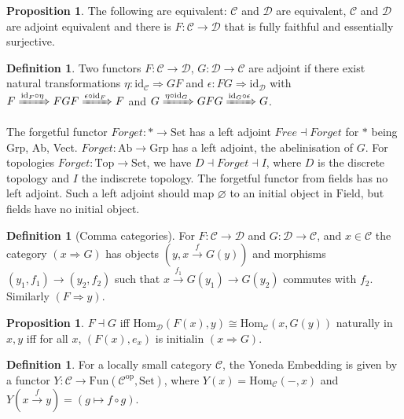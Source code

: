 \documentclass[a4paper,10pt]{article}
\theoremstyle{definition}
\newtheorem{definition}[theorem]{Definition}
\newtheorem{proposition}[theorem]{Proposition}
\newcommand{\Hom}[3][C]{\mathrm{Hom}_\mathcal{#1}(#2, #3)}
\newcommand{\C}{\mathcal{C}}
\newcommand{\D}{\mathcal{D}}
\newcommand{\id}{\mathrm{id}}
\newcommand{\Set}{\mathrm{Set}}
\begin{document}
\begin{proposition}
    The following are equivalent: $\C$ and $\D$ are equivalent, $\C$ and $\D$ are adjoint equivalent and there is $F \colon \C \rightarrow \D$ that is fully faithful and essentially surjective. 
\end{proposition}

\begin{definition}
    Two functors $F \colon \C \rightarrow \D$, $G \colon \D \rightarrow \C$ are adjoint if there exist natural transformations $\eta \colon \id_{\C} \Rightarrow GF$ and $\epsilon \colon FG \Rightarrow \id_{\D}$ with $F \xRightarrow{\id_F \circ \eta} FGF \xRightarrow{\epsilon \circ \id_F} F$ and $G \xRightarrow{\eta \circ \id_G} GFG \xRightarrow{\id_G \circ \epsilon} G$.
\end{definition}

The forgetful functor $\mathit{Forget} \colon * \rightarrow \Set$ has a left adjoint $\mathit{Free} \dashv \mathit{Forget}$ for $*$ being Grp, Ab, Vect. $\mathit{Forget} \colon \mathrm{Ab} \rightarrow \mathrm{Grp}$ has a left adjoint, the abelinisation of $G$. For topologies $\mathit{Forget} \colon \mathrm{Top} \longrightarrow \Set$, we have $D \dashv \mathit{Forget} \dashv I$, where $D$ is the discrete topology and $I$ the indiscrete topology.
The forgetful functor from fields has no left adjoint. Such a left adjoint should map $\varnothing$ to an initial object in $\mathrm{Field}$, but fields have no initial object.

\begin{definition}[Comma categories]
    For $F \colon \C \rightarrow \D$ and $G \colon \D \rightarrow \C$, and $x \in \C$ the category $(x \Rightarrow G)$ has objects $(y, x \xrightarrow{f} G(y))$ and morphisms $(y_1, f_1) \rightarrow (y_2, f_2)$ such that $x \xrightarrow{f_1} G(y_1) \rightarrow G(y_2)$ commutes with $f_2$. Similarly $(F \Rightarrow y)$.
\end{definition}

\begin{proposition}
    $F \dashv G$ iff $\Hom[D]{F(x)}{ y} \cong \Hom{x}{G(y)}$ naturally in $x, y$ iff for all $x$, $(F(x), e_x)$ is initialin $(x \Rightarrow G)$.
\end{proposition}
\begin{definition}
    For a locally small category $\C$, the Yoneda Embedding is given by a functor $Y \colon \C \longrightarrow \mathrm{Fun}(\C^\mathrm{op}, \Set)$, where $Y(x) = \Hom{-}{x}$ and $Y(x \xrightarrow{f} y)= (g \mapsto f \circ g)$.
\end{definition}
\end{document}
